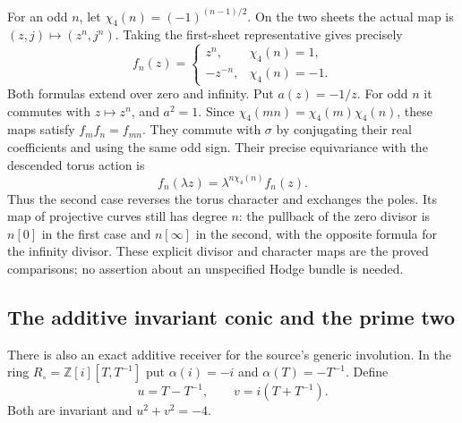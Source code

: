 \documentclass[11pt,a4paper]{article}
\theoremstyle{definition}\newtheorem{definition}[theorem]{Definition}
\newcommand{\Z}{\mathbb Z}\newcommand{\Q}{\mathbb Q}
\begin{document}
For an odd $n$, let $\chi_4(n)=(-1)^{(n-1)/2}$. On the two
sheets the actual map is $(z,j)\mapsto(z^n,j^n)$. Taking the
first-sheet representative gives precisely
\[
 f_n(z)=\begin{cases}z^n,&\chi_4(n)=1,\\
                      -z^{-n},&\chi_4(n)=-1.
        \end{cases}
 \tag{AT26}\label{at:eq:twistor-power}
\]
Both formulas extend over zero and infinity. Put $a(z)=-1/z$.
For odd $n$ it commutes with $z\mapsto z^n$, and $a^2=1$.
Since $\chi_4(mn)=\chi_4(m)\chi_4(n)$, these maps satisfy
$f_mf_n=f_{mn}$. They commute with $\sigma$ by conjugating their
real coefficients and using the same odd sign. Their precise
equivariance with the descended torus action is
\[
 f_n(\lambda z)=\lambda^{n\chi_4(n)}f_n(z).
 \tag{AT27}\label{at:eq:power-character}
\]
Thus the second case reverses the torus character and exchanges
the poles. Its map of projective curves still has degree $n$:
the pullback of the zero divisor is $n[0]$ in the first case
and $n[\infty]$ in the second, with the opposite formula for the
infinity divisor. These explicit divisor and character maps are
the proved comparisons; no assertion about an unspecified Hodge
bundle is needed.

\subsection{The additive invariant conic and the prime two}

There is also an exact additive receiver for the source's generic
involution. In the ring $R_\circ=\Z[i][T,T^{-1}]$ put
$\alpha(i)=-i$ and $\alpha(T)=-T^{-1}$. Define
\[
 u=T-T^{-1},\qquad v=i(T+T^{-1}).
 \tag{AT28}\label{at:eq:conic-coordinates}
\]
Both are invariant and $u^2+v^2=-4$.
\end{document}
